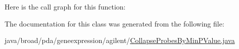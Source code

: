 Here is the call graph for this function\+:




The documentation for this class was generated from the following file\+:\begin{DoxyCompactItemize}
\item 
java/broad/pda/geneexpression/agilent/\hyperlink{_collapse_probes_by_min_p_value_8java}{Collapse\+Probes\+By\+Min\+P\+Value.\+java}\end{DoxyCompactItemize}
